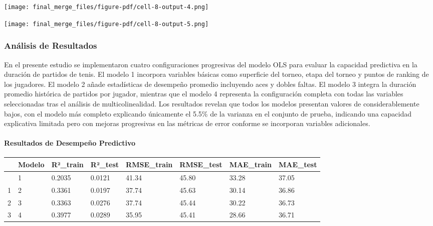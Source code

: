 \documentclass[
  letterpaper,
  DIV=11,
  numbers=noendperiod]{scrartcl}
\let\oldparagraph\paragraph
\renewcommand{\paragraph}[1]{\oldparagraph{#1}\mbox{}}
\begin{document}
\texttt{[image: final\_merge\_files/figure-pdf/cell-8-output-4.png]}

\texttt{[image: final\_merge\_files/figure-pdf/cell-8-output-5.png]}

\hypertarget{anuxe1lisis-de-resultados}{%
\subsubsection{Análisis de Resultados}\label{anuxe1lisis-de-resultados}}

En el presente estudio se implementaron cuatro configuraciones
progresivas del modelo OLS para evaluar la capacidad predictiva en la
duración de partidos de tenis. El modelo 1 incorpora variables básicas
como superficie del torneo, etapa del torneo y puntos de ranking de los
jugadores. El modelo 2 añade estadísticas de desempeño promedio
incluyendo aces y dobles faltas. El modelo 3 integra la duración
promedio histórica de partidos por jugador, mientras que el modelo 4
representa la configuración completa con todas las variables
seleccionadas tras el análisis de multicolinealidad. Los resultados
revelan que todos los modelos presentan valores de considerablemente
bajos, con el modelo más completo explicando únicamente el 5.5\% de la
varianza en el conjunto de prueba, indicando una capacidad explicativa
limitada pero con mejoras progresivas en las métricas de error conforme
se incorporan variables adicionales.

\hypertarget{resultados-de-desempeuxf1o-predictivo}{%
\paragraph{Resultados de Desempeño
Predictivo}\label{resultados-de-desempeuxf1o-predictivo}}

\begin{longtable}[]{@{}llllllll@{}}
\toprule\noalign{}
& Modelo & R²\_train & R²\_test & RMSE\_train & RMSE\_test & MAE\_train
& MAE\_test \\
\midrule\noalign{}
\endhead
\bottomrule\noalign{}
\endlastfoot
0 & 1 & 0.2035 & 0.0121 & 41.34 & 45.80 & 33.28 & 37.05 \\
1 & 2 & 0.3361 & 0.0197 & 37.74 & 45.63 & 30.14 & 36.86 \\
2 & 3 & 0.3363 & 0.0276 & 37.74 & 45.44 & 30.22 & 36.73 \\
3 & 4 & 0.3977 & 0.0289 & 35.95 & 45.41 & 28.66 & 36.71 \\
\end{longtable}
\end{document}
